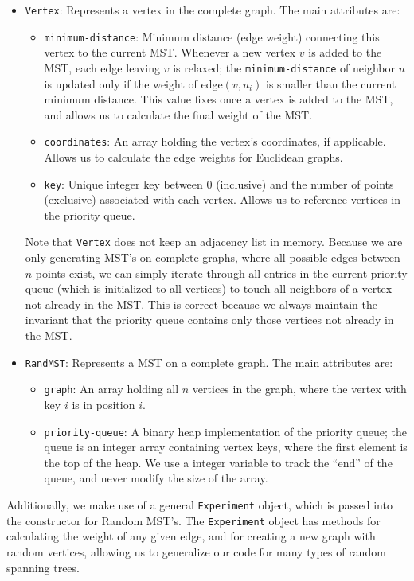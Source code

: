 \documentclass[a4paper]{article}
\begin{document}
\begin{itemize}
	\item \texttt{Vertex}: Represents a vertex in the complete graph. The main attributes are:
	\begin{itemize}
		\item \texttt{minimum-distance}: Minimum distance (edge weight) connecting this vertex to the current MST. Whenever a new vertex $v$ is added to the MST, each edge leaving $v$ is relaxed; the \texttt{minimum-distance} of neighbor $u$ is updated only if the weight of edge$(v, u_i)$ is smaller than the current minimum distance. This value fixes once a vertex is added to the MST, and allows us to calculate the final weight of the MST.
		\item \texttt{coordinates}: An array holding the vertex's coordinates, if applicable. Allows us to calculate the edge weights for Euclidean graphs.
		\item \texttt{key}: Unique integer key between 0 (inclusive) and the number of points (exclusive) associated with each vertex. Allows us to reference vertices in the priority queue.
	\end{itemize}
	Note that \texttt{Vertex} does not keep an adjacency list in memory. Because we are only generating MST's on complete graphs, where all possible edges between $n$ points exist, we can simply iterate through all entries in the current priority queue (which is initialized to all vertices) to touch all neighbors of a vertex not already in the MST. This is correct because we always maintain the invariant that the priority queue contains only those vertices not already in the MST.
	
	\item \texttt{RandMST}: Represents a MST on a complete graph. The main attributes are: 
	\begin{itemize}
		\item \texttt{graph}: An array holding all $n$ vertices in the graph, where the vertex with key $i$ is in position $i$.
		\item \texttt{priority-queue}: A binary heap implementation of the priority queue; the queue is an integer array containing vertex keys, where the first element is the top of the heap. We use a integer variable to track the ``end'' of the queue, and never modify the size of the array.
	\end{itemize}
\end{itemize}

Additionally, we make use of a general \texttt{Experiment} object, which is passed into the constructor for Random MST's. The \texttt{Experiment} object has methods for calculating the weight of any given edge, and for creating a new graph with random vertices, allowing us to generalize our code for many types of random spanning trees. 
\end{document}
